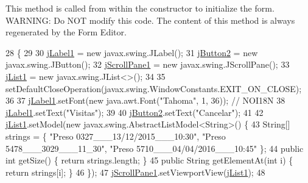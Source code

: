 This method is called from within the constructor to initialize the form. W\+A\+R\+N\+I\+NG\+: Do N\+OT modify this code. The content of this method is always regenerated by the Form Editor. 
\begin{DoxyCode}
28                                   \{
29 
30         \mbox{\hyperlink{classinterfacessoguar_1_1consultarvisitas_a3f7c47a95b552b6f38101034ebbc937c}{jLabel1}} = \textcolor{keyword}{new} javax.swing.JLabel();
31         \mbox{\hyperlink{classinterfacessoguar_1_1consultarvisitas_a09ee7f5abf5bf05970c4c33ee61dd1d0}{jButton2}} = \textcolor{keyword}{new} javax.swing.JButton();
32         \mbox{\hyperlink{classinterfacessoguar_1_1consultarvisitas_a123ca0ae66add36e7be0e216c23da5c1}{jScrollPane1}} = \textcolor{keyword}{new} javax.swing.JScrollPane();
33         \mbox{\hyperlink{classinterfacessoguar_1_1consultarvisitas_a0fc3a612950d2aa416bdde92beb96ac9}{jList1}} = \textcolor{keyword}{new} javax.swing.JList<>();
34 
35         setDefaultCloseOperation(javax.swing.WindowConstants.EXIT\_ON\_CLOSE);
36 
37         \mbox{\hyperlink{classinterfacessoguar_1_1consultarvisitas_a3f7c47a95b552b6f38101034ebbc937c}{jLabel1}}.setFont(\textcolor{keyword}{new} java.awt.Font(\textcolor{stringliteral}{"Tahoma"}, 1, 36)); \textcolor{comment}{// NOI18N}
38         \mbox{\hyperlink{classinterfacessoguar_1_1consultarvisitas_a3f7c47a95b552b6f38101034ebbc937c}{jLabel1}}.setText(\textcolor{stringliteral}{"Visitas"});
39 
40         \mbox{\hyperlink{classinterfacessoguar_1_1consultarvisitas_a09ee7f5abf5bf05970c4c33ee61dd1d0}{jButton2}}.setText(\textcolor{stringliteral}{"Cancelar"});
41 
42         \mbox{\hyperlink{classinterfacessoguar_1_1consultarvisitas_a0fc3a612950d2aa416bdde92beb96ac9}{jList1}}.setModel(\textcolor{keyword}{new} javax.swing.AbstractListModel<String>() \{
43             String[] strings = \{ \textcolor{stringliteral}{"Preso 0327\_\_\_13/12/2015\_\_\_10:30"}, \textcolor{stringliteral}{"Preso 5478\_\_\_3029\_\_\_11\_30"}, \textcolor{stringliteral}{"Preso
       5710\_\_\_04/04/2016\_\_\_10:45"} \};
44             \textcolor{keyword}{public} \textcolor{keywordtype}{int} getSize() \{ \textcolor{keywordflow}{return} strings.length; \}
45             \textcolor{keyword}{public} String getElementAt(\textcolor{keywordtype}{int} i) \{ \textcolor{keywordflow}{return} strings[i]; \}
46         \});
47         \mbox{\hyperlink{classinterfacessoguar_1_1consultarvisitas_a123ca0ae66add36e7be0e216c23da5c1}{jScrollPane1}}.setViewportView(\mbox{\hyperlink{classinterfacessoguar_1_1consultarvisitas_a0fc3a612950d2aa416bdde92beb96ac9}{jList1}});
48 

\end{DoxyCode}
